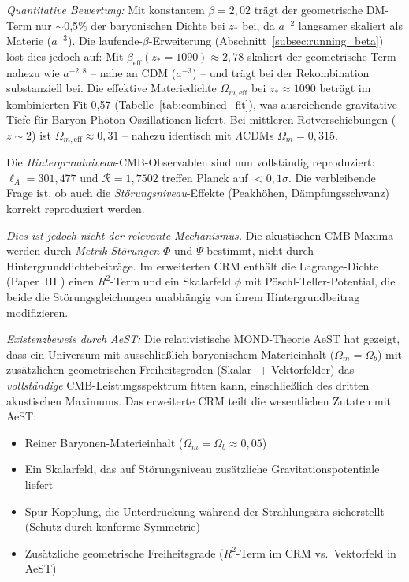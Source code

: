 \documentclass[aps,prd,twocolumn,superscriptaddress,nofootinbib,floatfix]{revtex4-2}
\begin{document}
\textit{Quantitative Bewertung:} Mit konstantem $\beta = 2{,}02$ trägt der geometrische DM-Term nur $\sim$0,5\% der baryonischen Dichte bei $z_*$ bei, da $a^{-2}$ langsamer skaliert als Materie ($a^{-3}$). Die laufende-$\beta$-Erweiterung (Abschnitt~\ref{subsec:running_beta}) löst dies jedoch auf: Mit $\beta_{\mathrm{eff}}(z_* = 1090) \approx 2{,}78$ skaliert der geometrische Term nahezu wie $a^{-2{,}8}$ -- nahe an CDM ($a^{-3}$) -- und trägt bei der Rekombination substanziell bei. Die effektive Materiedichte $\Omega_{m,\mathrm{eff}}$ bei $z_* \approx 1090$ beträgt im kombinierten Fit 0,57 (Tabelle~\ref{tab:combined_fit}), was ausreichende gravitative Tiefe für Baryon-Photon-Oszillationen liefert. Bei mittleren Rotverschiebungen ($z \sim 2$) ist $\Omega_{m,\mathrm{eff}} \approx 0{,}31$ -- nahezu identisch mit $\Lambda$CDMs $\Omega_m = 0{,}315$.

Die \textit{Hintergrundniveau}-CMB-Observablen sind nun vollständig reproduziert: $\ell_A = 301{,}477$ und $\mathcal{R} = 1{,}7502$ treffen Planck auf $<0{,}1\sigma$. Die verbleibende Frage ist, ob auch die \textit{Störungsniveau}-Effekte (Peakhöhen, Dämpfungsschwanz) korrekt reproduziert werden.

\textit{Dies ist jedoch nicht der relevante Mechanismus.} Die akustischen CMB-Maxima werden durch \textit{Metrik-Störungen} $\Phi$ und $\Psi$ bestimmt, nicht durch Hintergrunddichtebeiträge. Im erweiterten CRM enthält die Lagrange-Dichte (Paper~III \cite{Geiger2026c}) einen $R^2$-Term und ein Skalarfeld $\phi$ mit Pöschl-Teller-Potential, die beide die Störungsgleichungen unabhängig von ihrem Hintergrundbeitrag modifizieren.

\textit{Existenzbeweis durch AeST:} Die relativistische MOND-Theorie AeST \cite{Skordis2021} hat gezeigt, dass ein Universum mit ausschließlich baryonischem Materieinhalt ($\Omega_m = \Omega_b$) mit zusätzlichen geometrischen Freiheitsgraden (Skalar- + Vektorfelder) das \textit{vollständige} CMB-Leistungsspektrum fitten kann, einschließlich des dritten akustischen Maximums. Das erweiterte CRM teilt die wesentlichen Zutaten mit AeST:
\begin{itemize}
\item Reiner Baryonen-Materieinhalt ($\Omega_m = \Omega_b \approx 0{,}05$)
\item Ein Skalarfeld, das auf Störungsniveau zusätzliche Gravitationspotentiale liefert
\item Spur-Kopplung, die Unterdrückung während der Strahlungsära sicherstellt (Schutz durch konforme Symmetrie)
\item Zusätzliche geometrische Freiheitsgrade ($R^2$-Term im CRM vs.\ Vektorfeld in AeST)
\end{itemize}
\end{document}
